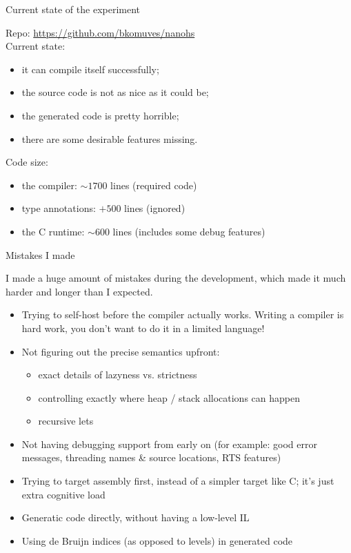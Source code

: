 \documentclass{beamer}
\begin{document}

\begin{frame}{Current state of the experiment}

Repo: \url{https://github.com/bkomuves/nanohs}\\[15pt]

Current state:
\begin{itemize}
\item it can compile itself successfully;
\item the source code is not as nice as it could be;
\item the generated code is pretty horrible;
\item there are some desirable features missing.\\[15pt]
\end{itemize}

Code size:
\begin{itemize}
\item the compiler: $\sim 1700$ lines (required code)
\item type annotations: $+500$ lines (ignored)
\item the C runtime: $\sim 600$ lines (includes some debug features)
\end{itemize}

\end{frame}


\begin{frame}{Mistakes I made}

{\small
I made a huge amount of mistakes during the development, which made it much
harder and longer than I expected.

\begin{itemize}
\item Trying to self-host before the compiler actually works. Writing a 
compiler is hard work, you don't want to do it in a limited language!
\item Not figuring out the precise semantics upfront:
   \begin{itemize}
   \item exact details of lazyness vs. strictness
   \item controlling exactly where heap / stack allocations can happen
   \item recursive lets
   \end{itemize}
\item Not having debugging support from early on (for example: good error messages, 
      threading names \& source locations, RTS features)
\item Trying to target assembly first, instead of a simpler target like C; it's just extra cognitive load
\item Generatic code directly, without having a low-level IL
\item Using de Bruijn indices (as opposed to levels) in generated code
\end{itemize}
}

\end{frame}
\end{document}
